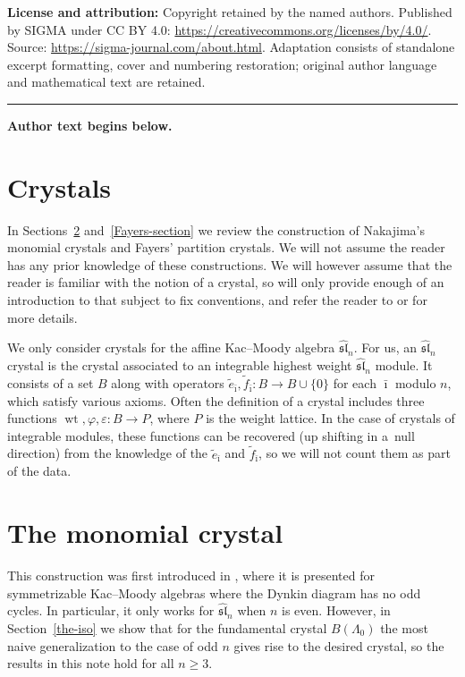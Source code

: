 \documentclass[11pt]{article}
\theoremstyle{definition}
\newcommand{\wt}{\operatorname{wt}}
\newcommand{\asl}{\widehat{\mathfrak{{sl}}}}
\begin{document}
\noindent\textbf{License and attribution:} Copyright retained by the named authors. Published by SIGMA under CC BY 4.0: \url{https://creativecommons.org/licenses/by/4.0/}. Source: \url{https://sigma-journal.com/about.html}. Adaptation consists of standalone excerpt formatting, cover and numbering restoration; original author language and mathematical text are retained.\par
\medskip\hrule\medskip\noindent\textbf{Author text begins below.}\par
\setcounter{section}{1}
\setcounter{subsection}{0}
\setcounter{subsubsection}{0}
\setcounter{equation}{0}
\section{Crystals} \label{crystals}

In Sections~\ref{mono-section} and~\ref{Fayers-section} we review the construction of Nakajima's monomial crystals and Fayers' partition crystals. We will not assume the reader has any prior knowledge of these constructions. We will however assume that the reader is familiar with the notion of a crystal, so will only provide enough of an introduction to that subject to f\/ix conventions, and refer the reader to  \cite{Kashiwara:1995} or \cite{Hong&Kang:2000} for more details.

We only consider crystals for the af\/f\/ine Kac--Moody algebra $\asl_n$. For us, an $\asl_n$ crystal is the crystal associated to an integrable highest weight $\asl_n$ module. It consists of a set $B$ along with operators $\tilde e_{\bar \imath}, \tilde f_{\bar \imath}: B \rightarrow B \cup \{ 0 \}$ for each $\bar \imath$ modulo $n$, which satisfy various axioms. Often the def\/inition of a crystal includes three functions $\wt, \varphi, \varepsilon: B \rightarrow P$, where $P$ is the weight lattice. In the case of crystals of integrable modules, these functions can be recovered (up shifting in a~null direction) from the knowledge of the $\tilde e_{\bar \imath}$ and $\tilde f_{\bar \imath}$, so we will not count them as part of the data.

\section{The monomial crystal} \label{mono-section}

This construction was f\/irst introduced in \cite[Section 3]{Nakajima:2003}, where it is presented for symmetrizable Kac--Moody algebras where the Dynkin diagram has no odd cycles. In particular, it only works for $\asl_n$ when $n$ is even. However, in Section~\ref{the-iso} we show that for the fundamental crystal $B(\Lambda_0)$ the most naive generalization to the case of odd $n$ gives rise to the desired crystal, so the results in this note hold for all  $n \geq 3$.
\end{document}
